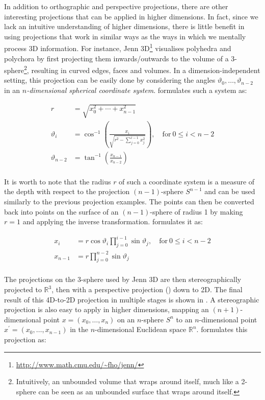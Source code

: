 In addition to orthographic and perspective projections, there are other interesting projections that can be applied in higher dimensions.
In fact, since we lack an intuitive understanding of higher dimensions, there is little benefit in using projections that work in similar ways as the ways in which we mentally process 3D information.
For instance, Jenn 3D\footnote{\url{http://www.math.cmu.edu/~fho/jenn/}} visualises polyhedra and polychora by first projecting them inwards/outwards to the volume of a 3-sphere\footnote{Intuitively, an unbounded volume that wraps around itself, much like a 2-sphere can be seen as an unbounded surface that wraps around itself.}, resulting in curved edges, faces and volumes.
In a dimension-independent setting, this projection can be easily done by considering the angles $\vartheta_0, \ldots, \vartheta_{n-2}$ in an \emph{$n$-dimensional spherical coordinate system}.
\citet[\S{}12.2]{Steeb11} formulates such a system as:


\begin{align*}
r &= \sqrt{x_0^2 + \cdots + x_{n-1}^2} \\
\vartheta_i &= \cos^{-1} \left( \frac{x_i}{\sqrt{r^2 - \sum_{j=0}^{i-1} x_j^2}} \right), \mathrm{\quad{}for\ } 0 \leq i < n-2 \\
\vartheta_{n-2} &= \tan^{-1} \left( \frac{x_{n-1}}{x_{n-2}} \right) \\
\end{align*}

It is worth to note that the radius $r$ of such a coordinate system is a measure of the depth with respect to the projection $(n-1)$-sphere $S^{n-1}$ and can be used similarly to the previous projection examples.
The points can then be converted back into points on the surface of an $(n-1)$-sphere of radius 1 by making $r = 1$ and applying the inverse transformation.
\citet[\S{}12.2]{Steeb11} formulates it as:

\begin{align*}
x_i &= r \cos \vartheta_i \prod_{j=0}^{i-1} \sin \vartheta_j, \mathrm{\quad{}for\ } 0 \leq i < n-2 \\
x_{n-1} &= r \prod_{j=0}^{n-2} \sin \vartheta_j \\
\end{align*}

The projections on the 3-sphere used by Jenn 3D are then stereographically projected to $\mathbb{R}^3$, then with a perspective projection () down to 2D.
The final result of this 4D-to-2D projection in multiple stages is shown in .
A stereographic projection is also easy to apply in higher dimensions, mapping an $(n+1)$-dimensional point $x = (x_0, \ldots, x_n)$ on an $n$-sphere $S^n$ to an $n$-dimensional point $x^\prime = (x_0, \ldots, x_{n-1})$ in the $n$-dimensional Euclidean space $\mathbb{R}^n$.
\citet{Chisholm00} formulates this projection as:

